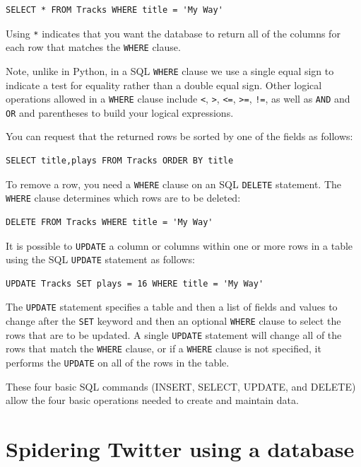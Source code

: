 \documentclass[11pt]{book}
\begin{document}
\beforeverb
\begin{verbatim}
SELECT * FROM Tracks WHERE title = 'My Way'
\end{verbatim}
\afterverb
%
Using \verb"*" indicates that you want the database to return all of 
the columns for each row that matches the {\tt WHERE} clause.  

Note, unlike in Python, in a SQL {\tt WHERE} clause 
we use a single equal sign 
to indicate a test for equality rather than a double equal sign.
Other logical operations allowed in a {\tt WHERE} clause include 
\verb"<",
\verb">",
\verb"<=",
\verb">=",
\verb"!=",
as well as {\tt AND} and {\tt OR} and parentheses
to build your logical expressions.

You can request that the returned rows be sorted by one of 
the fields as follows:

\beforeverb
\begin{verbatim}
SELECT title,plays FROM Tracks ORDER BY title
\end{verbatim}
\afterverb
%
To remove a row, you need a {\tt WHERE} clause on an SQL {\tt DELETE}
statement.  The {\tt WHERE} clause determines which rows are to be deleted:

\beforeverb
\begin{verbatim}
DELETE FROM Tracks WHERE title = 'My Way'
\end{verbatim}
\afterverb
%
It is possible to {\tt UPDATE} a column or columns within one or more rows
in a table using the SQL {\tt UPDATE} statement as follows:

\beforeverb
\begin{verbatim}
UPDATE Tracks SET plays = 16 WHERE title = 'My Way'
\end{verbatim}
\afterverb
%
The {\tt UPDATE} statement specifies a table and 
then a list of fields and values to change after the {\tt SET} 
keyword and then an optional {\tt WHERE} clause to select
the rows that are to be updated.  A single {\tt UPDATE} statement
will change all of the rows that match the {\tt WHERE} clause, or if 
a {\tt WHERE} clause is not specified, it performs the {\tt UPDATE}
on all of the rows in the table.

These four basic SQL commands (INSERT, SELECT, UPDATE, and DELETE) allow 
the four basic operations needed to create and maintain data.


\section{Spidering Twitter using a database}
\end{document}
